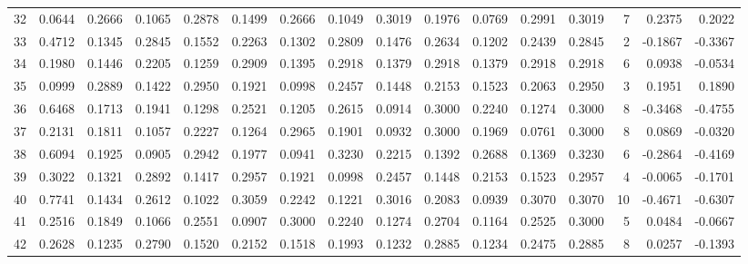 \begin{tabular}{lrrrrrrrrrrrrrrr}
32  &      0.0644 &  0.2666 &  0.1065 &  0.2878 &  0.1499 &  0.2666 &  0.1049 &  0.3019 &  0.1976 &  0.0769 &   0.2991 &     0.3019 &      7 &                    0.2375 &                     0.2022 \\
33  &      0.4712 &  0.1345 &  0.2845 &  0.1552 &  0.2263 &  0.1302 &  0.2809 &  0.1476 &  0.2634 &  0.1202 &   0.2439 &     0.2845 &      2 &                   -0.1867 &                    -0.3367 \\
34  &      0.1980 &  0.1446 &  0.2205 &  0.1259 &  0.2909 &  0.1395 &  0.2918 &  0.1379 &  0.2918 &  0.1379 &   0.2918 &     0.2918 &      6 &                    0.0938 &                    -0.0534 \\
35  &      0.0999 &  0.2889 &  0.1422 &  0.2950 &  0.1921 &  0.0998 &  0.2457 &  0.1448 &  0.2153 &  0.1523 &   0.2063 &     0.2950 &      3 &                    0.1951 &                     0.1890 \\
36  &      0.6468 &  0.1713 &  0.1941 &  0.1298 &  0.2521 &  0.1205 &  0.2615 &  0.0914 &  0.3000 &  0.2240 &   0.1274 &     0.3000 &      8 &                   -0.3468 &                    -0.4755 \\
37  &      0.2131 &  0.1811 &  0.1057 &  0.2227 &  0.1264 &  0.2965 &  0.1901 &  0.0932 &  0.3000 &  0.1969 &   0.0761 &     0.3000 &      8 &                    0.0869 &                    -0.0320 \\
38  &      0.6094 &  0.1925 &  0.0905 &  0.2942 &  0.1977 &  0.0941 &  0.3230 &  0.2215 &  0.1392 &  0.2688 &   0.1369 &     0.3230 &      6 &                   -0.2864 &                    -0.4169 \\
39  &      0.3022 &  0.1321 &  0.2892 &  0.1417 &  0.2957 &  0.1921 &  0.0998 &  0.2457 &  0.1448 &  0.2153 &   0.1523 &     0.2957 &      4 &                   -0.0065 &                    -0.1701 \\
40  &      0.7741 &  0.1434 &  0.2612 &  0.1022 &  0.3059 &  0.2242 &  0.1221 &  0.3016 &  0.2083 &  0.0939 &   0.3070 &     0.3070 &     10 &                   -0.4671 &                    -0.6307 \\
41  &      0.2516 &  0.1849 &  0.1066 &  0.2551 &  0.0907 &  0.3000 &  0.2240 &  0.1274 &  0.2704 &  0.1164 &   0.2525 &     0.3000 &      5 &                    0.0484 &                    -0.0667 \\
42  &      0.2628 &  0.1235 &  0.2790 &  0.1520 &  0.2152 &  0.1518 &  0.1993 &  0.1232 &  0.2885 &  0.1234 &   0.2475 &     0.2885 &      8 &                    0.0257 &                    -0.1393 \\

\end{tabular}
